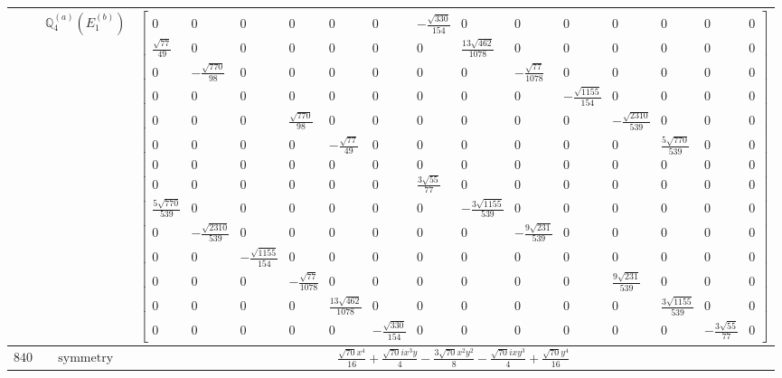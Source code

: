 \documentclass[fleqn,8pt,landscape]{jsarticle}
\begin{document}
\begin{longtable}{ccc}
$  $ & $ \mathbb{Q}_{4}^{(a)}(E_{1}^{(b)}) $ & $ \begin{bmatrix} 0 & 0 & 0 & 0 & 0 & 0 & - \frac{\sqrt{330}}{154} & 0 & 0 & 0 & 0 & 0 & 0 & 0 \\ \frac{\sqrt{77}}{49} & 0 & 0 & 0 & 0 & 0 & 0 & \frac{13 \sqrt{462}}{1078} & 0 & 0 & 0 & 0 & 0 & 0 \\ 0 & - \frac{\sqrt{770}}{98} & 0 & 0 & 0 & 0 & 0 & 0 & - \frac{\sqrt{77}}{1078} & 0 & 0 & 0 & 0 & 0 \\ 0 & 0 & 0 & 0 & 0 & 0 & 0 & 0 & 0 & - \frac{\sqrt{1155}}{154} & 0 & 0 & 0 & 0 \\ 0 & 0 & 0 & \frac{\sqrt{770}}{98} & 0 & 0 & 0 & 0 & 0 & 0 & - \frac{\sqrt{2310}}{539} & 0 & 0 & 0 \\ 0 & 0 & 0 & 0 & - \frac{\sqrt{77}}{49} & 0 & 0 & 0 & 0 & 0 & 0 & \frac{5 \sqrt{770}}{539} & 0 & 0 \\ 0 & 0 & 0 & 0 & 0 & 0 & 0 & 0 & 0 & 0 & 0 & 0 & 0 & 0 \\ 0 & 0 & 0 & 0 & 0 & 0 & \frac{3 \sqrt{55}}{77} & 0 & 0 & 0 & 0 & 0 & 0 & 0 \\ \frac{5 \sqrt{770}}{539} & 0 & 0 & 0 & 0 & 0 & 0 & - \frac{3 \sqrt{1155}}{539} & 0 & 0 & 0 & 0 & 0 & 0 \\ 0 & - \frac{\sqrt{2310}}{539} & 0 & 0 & 0 & 0 & 0 & 0 & - \frac{9 \sqrt{231}}{539} & 0 & 0 & 0 & 0 & 0 \\ 0 & 0 & - \frac{\sqrt{1155}}{154} & 0 & 0 & 0 & 0 & 0 & 0 & 0 & 0 & 0 & 0 & 0 \\ 0 & 0 & 0 & - \frac{\sqrt{77}}{1078} & 0 & 0 & 0 & 0 & 0 & 0 & \frac{9 \sqrt{231}}{539} & 0 & 0 & 0 \\ 0 & 0 & 0 & 0 & \frac{13 \sqrt{462}}{1078} & 0 & 0 & 0 & 0 & 0 & 0 & \frac{3 \sqrt{1155}}{539} & 0 & 0 \\ 0 & 0 & 0 & 0 & 0 & - \frac{\sqrt{330}}{154} & 0 & 0 & 0 & 0 & 0 & 0 & - \frac{3 \sqrt{55}}{77} & 0 \end{bmatrix} $ \\ \hline
$ 840 $ & $ \text{symmetry} $ & $ \frac{\sqrt{70} x^{4}}{16} + \frac{\sqrt{70} i x^{3} y}{4} - \frac{3 \sqrt{70} x^{2} y^{2}}{8} - \frac{\sqrt{70} i x y^{3}}{4} + \frac{\sqrt{70} y^{4}}{16} $ \\

\end{longtable}
\end{document}
